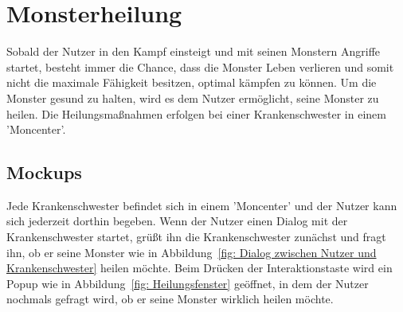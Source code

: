 \section{Monsterheilung}\label{sec:monster-heilen}
Sobald der Nutzer in den Kampf einsteigt und mit seinen Monstern Angriffe startet, besteht immer die Chance, dass die Monster Leben verlieren und somit nicht die maximale Fähigkeit besitzen, optimal kämpfen zu können. Um die Monster gesund zu halten, wird es dem Nutzer ermöglicht, seine Monster zu heilen.
Die Heilungsmaßnahmen erfolgen bei einer Krankenschwester in einem 'Moncenter'.
\subsection{Mockups}\label{subsec:mockups-monster-heilen}
Jede Krankenschwester befindet sich in einem 'Moncenter' und der Nutzer kann sich jederzeit dorthin begeben.
Wenn der Nutzer einen Dialog mit der Krankenschwester startet, grüßt ihn die Krankenschwester zunächst und fragt ihn, ob er seine Monster wie in Abbildung~\ref{fig: Dialog zwischen Nutzer und Krankenschwester} heilen möchte.
Beim Drücken der Interaktionstaste wird ein Popup wie in Abbildung~\ref{fig: Heilungsfenster} geöffnet, in dem der Nutzer nochmals gefragt wird, ob er seine Monster wirklich heilen möchte.

